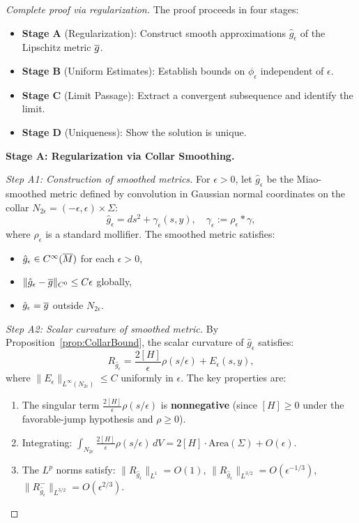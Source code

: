 \begin{proof}[Complete proof via regularization]
The proof proceeds in four stages:
\begin{itemize}
    \item \textbf{Stage A} (Regularization): Construct smooth approximations $\hat{g}_\epsilon$ of the Lipschitz metric $\overline{g}$.
    \item \textbf{Stage B} (Uniform Estimates): Establish bounds on $\phi_\epsilon$ independent of $\epsilon$.
    \item \textbf{Stage C} (Limit Passage): Extract a convergent subsequence and identify the limit.
    \item \textbf{Stage D} (Uniqueness): Show the solution is unique.
\end{itemize}

\textbf{Stage A: Regularization via Collar Smoothing.}

\textit{Step A1: Construction of smoothed metrics.}
For $\epsilon > 0$, let $\hat{g}_\epsilon$ be the Miao-smoothed metric defined by convolution in Gaussian normal coordinates on the collar $N_{2\epsilon} = (-\epsilon, \epsilon) \times \Sigma$:
\begin{equation}
    \hat{g}_\epsilon = ds^2 + \gamma_\epsilon(s, y), \quad \gamma_\epsilon := \rho_\epsilon * \gamma,
\end{equation}
where $\rho_\epsilon$ is a standard mollifier. The smoothed metric satisfies:
\begin{itemize}
    \item $\hat{g}_\epsilon \in C^\infty(\overline{M})$ for each $\epsilon > 0$,
    \item $\|\hat{g}_\epsilon - \overline{g}\|_{C^0} \le C\epsilon$ globally,
    \item $\hat{g}_\epsilon = \overline{g}$ outside $N_{2\epsilon}$.
\end{itemize}

\textit{Step A2: Scalar curvature of smoothed metric.}
By Proposition~\ref{prop:CollarBound}, the scalar curvature of $\hat{g}_\epsilon$ satisfies:
\begin{equation}\label{eq:RegScalar}
    R_{\hat{g}_\epsilon} = \frac{2[H]}{\epsilon} \rho(s/\epsilon) + E_\epsilon(s,y),
\end{equation}
where $\|E_\epsilon\|_{L^\infty(N_{2\epsilon})} \le C$ uniformly in $\epsilon$. The key properties are:
\begin{enumerate}
    \item The singular term $\frac{2[H]}{\epsilon}\rho(s/\epsilon)$ is \textbf{nonnegative} (since $[H] \ge 0$ under the favorable-jump hypothesis and $\rho \ge 0$).
    \item Integrating: $\int_{N_{2\epsilon}} \frac{2[H]}{\epsilon}\rho(s/\epsilon) \, dV = 2[H] \cdot \text{Area}(\Sigma) + O(\epsilon)$.
    \item The $L^p$ norms satisfy: $\|R_{\hat{g}_\epsilon}\|_{L^1} = O(1)$, $\|R_{\hat{g}_\epsilon}\|_{L^{3/2}} = O(\epsilon^{-1/3})$, $\|R_{\hat{g}_\epsilon}^-\|_{L^{3/2}} = O(\epsilon^{2/3})$.
\end{enumerate}


\end{proof}
